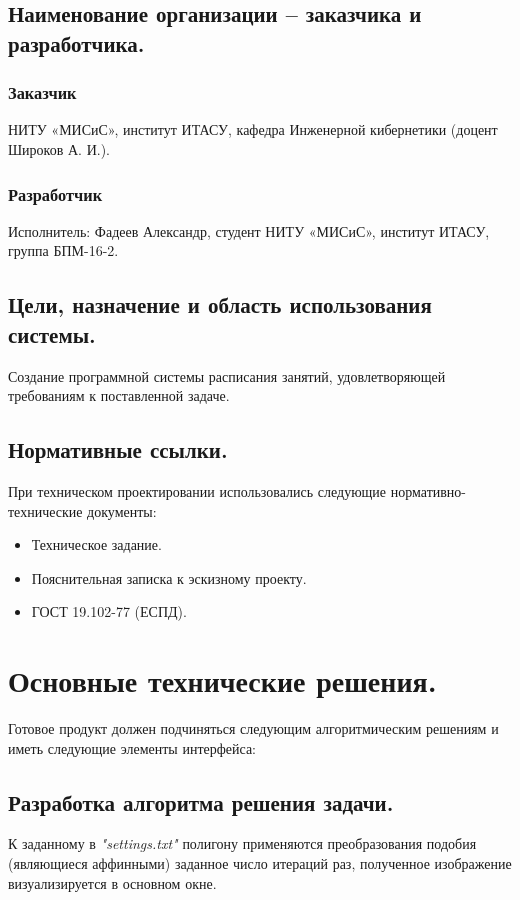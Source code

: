 \documentclass[a4paper,12pt,preview]{report} %
\begin{document}
	\subsection{Наименование организации -- заказчика и разработчика.}
	\subsubsection{Заказчик}
	НИТУ «МИСиС», институт ИТАСУ, кафедра Инженерной кибернетики (доцент Широков А. И.).
	\subsubsection{Разработчик}
	Исполнитель: Фадеев Александр, студент НИТУ «МИСиС», институт ИТАСУ, группа БПМ-16-2.
	
	\subsection{Цели, назначение и область использования системы.}
	Создание программной системы расписания занятий, удовлетворяющей требованиям к поставленной задаче.
		
	\subsection{Нормативные ссылки.}
	При техническом проектировании использовались следующие нормативно-технические документы:
	
	\begin{itemize}
		\item Техническое задание.
		\item Пояснительная записка к эскизному проекту.
		\item ГОСТ 19.102-77 (ЕСПД).
	\end{itemize}


	\section{Основные технические решения.}
		
	Готовое продукт должен подчиняться следующим алгоритмическим решениям и иметь следующие элементы интерфейса:
	
	\subsection{Разработка алгоритма решения задачи.}
		
		К заданному в \textit{"settings.txt"} полигону применяются преобразования подобия (являющиеся аффинными) заданное число итераций раз, полученное изображение визуализируется в основном окне.
		
\end{document}
